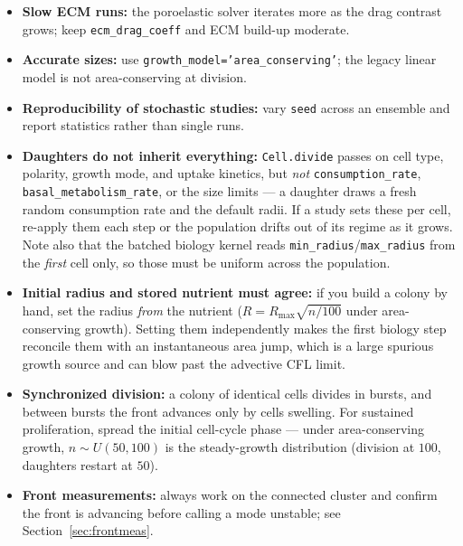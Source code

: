 \documentclass[11pt]{article}
\newcommand{\code}[1]{\texttt{#1}}
\begin{document}
\begin{itemize}
        a huge viscosity; prefer \code{fluid\_model='brinkman\_fft'} with a
        chosen screening length for a physical, fast fluid.
  \item \textbf{Slow ECM runs:} the poroelastic solver iterates more as the drag
        contrast grows; keep \code{ecm\_drag\_coeff} and ECM build-up moderate.
  \item \textbf{Accurate sizes:} use \code{growth\_model='area\_conserving'};
        the legacy linear model is not area-conserving at division.
  \item \textbf{Reproducibility of stochastic studies:} vary \code{seed} across
        an ensemble and report statistics rather than single runs.
  \item \textbf{Daughters do not inherit everything:} \code{Cell.divide} passes on
        cell type, polarity, growth mode, and uptake kinetics, but \emph{not}
        \code{consumption\_rate}, \code{basal\_metabolism\_rate}, or the size
        limits --- a daughter draws a fresh random consumption rate and the
        default radii. If a study sets these per cell, re-apply them each step or
        the population drifts out of its regime as it grows. Note also that the
        batched biology kernel reads \code{min\_radius}/\code{max\_radius} from the
        \emph{first} cell only, so those must be uniform across the population.
  \item \textbf{Initial radius and stored nutrient must agree:} if you build a
        colony by hand, set the radius \emph{from} the nutrient
        ($R = R_{\max}\sqrt{n/100}$ under area-conserving growth). Setting them
        independently makes the first biology step reconcile them with an
        instantaneous area jump, which is a large spurious growth source and can
        blow past the advective CFL limit.
  \item \textbf{Synchronized division:} a colony of identical cells divides in
        bursts, and between bursts the front advances only by cells swelling.
        For sustained proliferation, spread the initial cell-cycle phase --- under
        area-conserving growth, $n\sim U(50,100)$ is the steady-growth
        distribution (division at $100$, daughters restart at $50$).
  \item \textbf{Front measurements:} always work on the connected cluster and
        confirm the front is advancing before calling a mode unstable; see
        Section~\ref{sec:frontmeas}.
\end{itemize}
\end{document}
